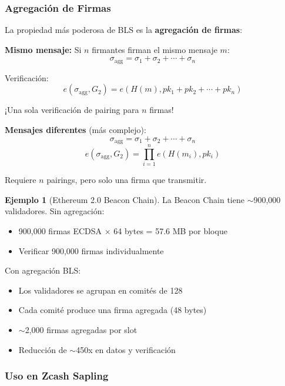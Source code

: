 \documentclass[11pt,a4paper,twoside,openright]{book}
\theoremstyle{definition}
\newtheorem{example}{Ejemplo}[chapter]
\theoremstyle{plain}
\theoremstyle{remark}
\begin{document}
\subsubsection{Agregación de Firmas}

\begin{keyidea}
La propiedad más poderosa de BLS es la \textbf{agregación de firmas}:

\textbf{Mismo mensaje:}
Si $n$ firmantes firman el mismo mensaje $m$:
\[ \sigma_{\text{agg}} = \sigma_1 + \sigma_2 + \cdots + \sigma_n \]

Verificación:
\[ e(\sigma_{\text{agg}}, G_2) = e(H(m), pk_1 + pk_2 + \cdots + pk_n) \]

¡Una sola verificación de pairing para $n$ firmas!

\textbf{Mensajes diferentes} (más complejo):
\[ \sigma_{\text{agg}} = \sigma_1 + \sigma_2 + \cdots + \sigma_n \]
\[ e(\sigma_{\text{agg}}, G_2) = \prod_{i=1}^{n} e(H(m_i), pk_i) \]

Requiere $n$ pairings, pero solo una firma que transmitir.
\end{keyidea}

\begin{example}[Ethereum 2.0 Beacon Chain]
La Beacon Chain tiene $\sim$900,000 validadores. Sin agregación:
\begin{itemize}
    \item 900,000 firmas ECDSA × 64 bytes = 57.6 MB por bloque
    \item Verificar 900,000 firmas individualmente
\end{itemize}

Con agregación BLS:
\begin{itemize}
    \item Los validadores se agrupan en comités de 128
    \item Cada comité produce una firma agregada (48 bytes)
    \item $\sim$2,000 firmas agregadas por slot
    \item Reducción de $\sim$450x en datos y verificación
\end{itemize}
\end{example}

\subsubsection{Uso en Zcash Sapling}
\end{document}
